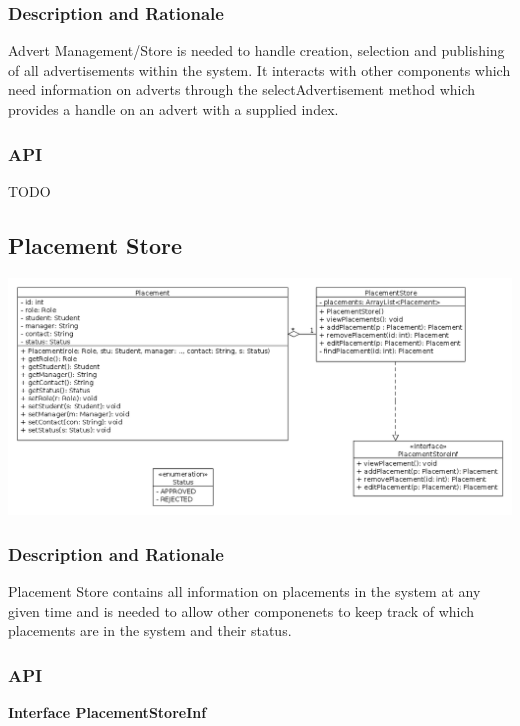 \documentclass{l3deliverable}
\begin{document}
\subsubsection{Description and Rationale}
Advert Management/Store is needed to handle creation, selection and publishing of all advertisements within the system. It interacts with other components which need information on adverts through the selectAdvertisement method which provides a handle on an advert with a supplied index.
\subsubsection{API}
TODO

\subsection{Placement Store}
\includegraphics[scale = 0.4]{ClassDiagram_PlacementStore.png}
\subsubsection{Description and Rationale}
Placement Store contains all information on placements in the system at any given time and is needed to allow other componenets to keep track of which placements are in the system and their status.
\subsubsection{API}
\textbf{Interface PlacementStoreInf}\\
\end{document}

